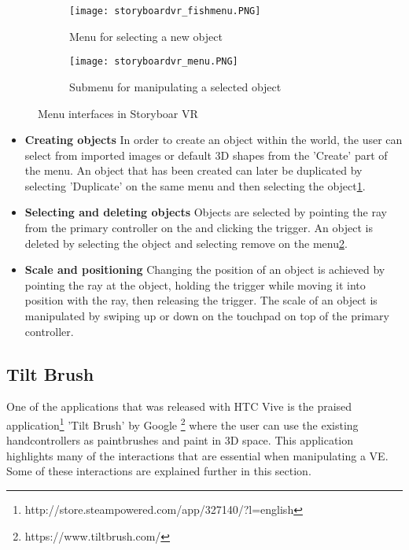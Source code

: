 \begin{figure}
\begin{subfigure}{.5\textwidth}
  \centering
  \texttt{[image: storyboardvr\_fishmenu.PNG]}
  \caption{Menu for selecting a new object}
  \label{fig:storyboard:fishmenu}
\end{subfigure}%
\begin{subfigure}{.5\textwidth}
  \centering
  \texttt{[image: storyboardvr\_menu.PNG]}
  \caption{Submenu for manipulating a selected object}
  \label{fig:storyboard:menu}
\end{subfigure}
\caption{Menu interfaces in Storyboar VR}
\label{fig:storyboard}
\end{figure}
\begin{itemize}


\item \textbf{Creating objects}
In order to create an object within the world, the user can select from imported images or default 3D shapes from the 'Create' part of the menu. An object that has been created can later be duplicated by selecting 'Duplicate' on the same menu and then selecting the object\ref{fig:storyboard:fishmenu}.
\item \textbf{Selecting and deleting objects}
Objects are selected by pointing the ray from the primary controller on the and clicking the trigger. An object is deleted by selecting the object and selecting remove on the menu\ref{fig:storyboard:menu}.
\item \textbf{Scale and positioning}
Changing the position of an object is achieved by pointing the ray at the object, holding the trigger while moving it into position with the ray, then releasing the trigger. The scale of an object is manipulated by  swiping up or down on the touchpad on top of the primary controller.
\end{itemize}
\subsection{Tilt Brush}
\label{theory:best-practice:tiltbrush}
 One of the applications that was released with HTC Vive is the praised application\footnote{http://store.steampowered.com/app/327140/?l=english} 'Tilt Brush' by Google \footnote{https://www.tiltbrush.com/} where the user can use the existing handcontrollers as paintbrushes and paint in 3D space. This application highlights many of the interactions that are essential when manipulating a VE. Some of these interactions are explained further in this section.

